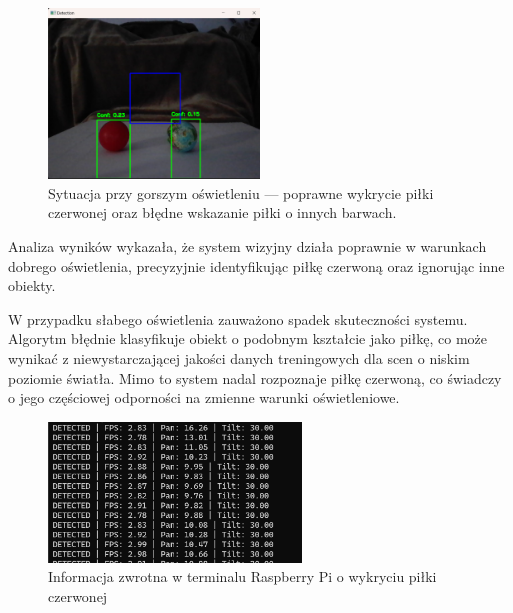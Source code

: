\documentclass[a4paper,twoside,12pt]{book}
\begin{document}
\begin{figure}[!hb]
    \centering
    \includegraphics[width=0.5\textwidth]{Images/Porownanie/Yolo7 robot/Zrzut ekranu 2025-01-02 194208.png}
    \caption{Sytuacja przy gorszym oświetleniu — poprawne wykrycie piłki czerwonej oraz błędne wskazanie piłki o innych barwach.}
    \label{fig:Wykrycie_piłki2}
\end{figure}

\newpage
Analiza wyników wykazała, że system wizyjny działa poprawnie w warunkach dobrego oświetlenia, precyzyjnie identyfikując piłkę czerwoną oraz ignorując inne obiekty.

W przypadku słabego oświetlenia zauważono spadek skuteczności systemu. Algorytm błędnie klasyfikuje obiekt o podobnym kształcie jako piłkę, co może wynikać z niewystarczającej jakości danych treningowych dla scen o niskim poziomie światła. Mimo to system nadal rozpoznaje piłkę czerwoną, co świadczy o jego częściowej odporności na zmienne warunki oświetleniowe.

\begin{figure}[!hb]
    \centering
    \includegraphics[width=0.6\textwidth]{Images/Porownanie/Yolo7 robot/Para pilek ciemno poprawnie wskazal czerwona.png}
    \caption{Informacja zwrotna w terminalu Raspberry Pi o wykryciu piłki czerwonej}
    \label{fig:TerminalOutput}
\end{figure}
\end{document}
